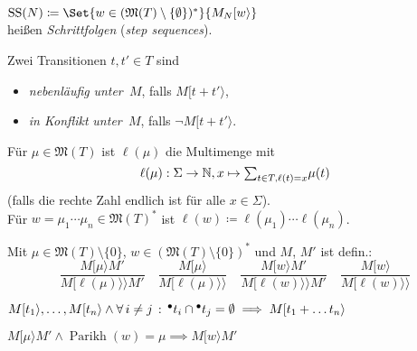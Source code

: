 \documentclass{cheat-sheet}
\newcommand{\preset}[1]{{}^\bullet{#1}} %
\newcommand{\activeTransition}[1]{[{#1}\rangle} %
\newcommand{\labelledTransition}[1]{[{#1}\rangle\rangle} %
\DeclareMathOperator{\Parikh}{Parikh} %
\newcommand{\inferrule}[2]{\frac{{#1}}{{#2}}} %
\newcommand{\Markings}{\mathfrak{M}} %
\newcommand{\Multisets}{\mathfrak{M}} %
\DeclareMathOperator{\StepSequences}{SS} %
\begin{document}
\begin{defn}
  \begin{minipage}[t]{0.8 \linewidth}
    $\StepSequences(N) \coloneqq \Set{w \in (\Markings(T) \setminus \{ \emptyset \})^{*}}{M_N \activeTransition{w}}$ \\
    heißen \emph{Schrittfolgen} (\textit{step sequences}).
  \end{minipage}
\end{defn}

\begin{defn}
  Zwei Transitionen $t, t' \in T$ sind
  \begin{itemize}
    \item \emph{nebenläufig} \textit{unter~$M$}, falls $M \activeTransition{t + t'}$,
    \item \emph{in Konflikt} \textit{unter~$M$}, falls $\neg M \activeTransition{t + t'}$.
  \end{itemize}
\end{defn}

\begin{nota}
  Für $\mu \in \Multisets(T)$ ist $\ell(\mu)$ die Multimenge mit
  \[
    \ell(\mu) : \Sigma \to \N, x \mapsto {\sum}_{t \in T, \ell(t) = x} \mu(t)
  \]
  (falls die rechte Zahl endlich ist für alle $x \in \Sigma$). \\
  Für $w = \mu_1 \cdots \mu_n \in \Multisets(T)^{*}$ ist 
  $\ell(w) \coloneqq \ell(\mu_1) \cdots \ell(\mu_n)$.
\end{nota}

\begin{defn}
  Mit $\mu \in \Markings(T) \setminus \{ 0 \}$, $w \in (\Markings(T) \setminus \{ 0 \})^{*}$ und $M$, $M'$ ist defin.:
  \[
    \inferrule
      {M \activeTransition{\mu} M'}
      {M \labelledTransition{\ell(\mu)} M'} \quad
    \inferrule
      {M \activeTransition{\mu}}
      {M \labelledTransition{\ell(\mu)}} \quad
    \inferrule
      {M \activeTransition{w} M'}
      {M \labelledTransition{\ell(w)} M'} \quad
    \inferrule
      {M \activeTransition{w}}
      {M \labelledTransition{\ell(w)}}
  \]
\end{defn}

\begin{lem}
  $M \activeTransition{t_1}, \ldots, M \activeTransition{t_n} \wedge \fa{i \neq j} \preset{t_i} \cap \preset{t_j} = \emptyset \implies M \activeTransition{t_1 + \ldots t_n}$
\end{lem}

\begin{lem}
  $M \activeTransition{\mu} M' \wedge \Parikh(w) = \mu \implies M \activeTransition{w} M'$
\end{lem}
\end{document}
